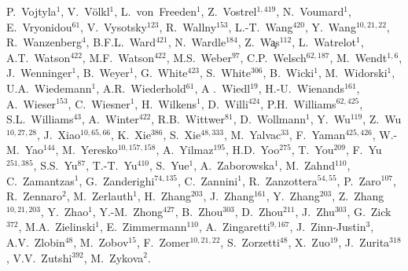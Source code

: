 P.~Vojtyla$^{{1}}$,
V.~V{\"o}lkl$^{{1}}$,
L.~von~Freeden$^{{1}}$,
Z.~Vostrel$^{{1, 419}}$,
N.~Voumard$^{{1}}$,
E.~Vryonidou$^{{61}}$,
V.~Vysotsky$^{{123}}$,
R.~Wallny$^{{153}}$,
L.-T.~Wang$^{{420}}$,
Y.~Wang$^{{10, 21, 22}}$,
R.~Wanzenberg$^{{4}}$,
B.F.L.~Ward$^{{421}}$,
N.~Wardle$^{{184}}$,
Z.~W{\c a}s$^{{112}}$,
L.~Watrelot$^{{1}}$,
A.T.~Watson$^{{422}}$,
M.F.~Watson$^{{422}}$,
M.S.~Weber$^{{97}}$,
C.P.~Welsch$^{{62, 187}}$,
M.~Wendt$^{{1, 6}}$,
J.~Wenninger$^{{1}}$,
B.~Weyer$^{{1}}$,
G.~White$^{{423}}$,
S.~White$^{{306}}$,
B.~Wicki$^{{1}}$,
M.~Widorski$^{{1}}$,
U.A.~Wiedemann$^{{1}}$,
A.R.~Wiederhold$^{{61}}$,
A .~Wiedl$^{{19}}$,
H.-U.~Wienands$^{{161}}$,
A.~Wieser$^{{153}}$,
C.~Wiesner$^{{1}}$,
H.~Wilkens$^{{1}}$,
D.~Willi$^{{424}}$,
P.H.~Williams$^{{62, 425}}$,
S.L.~Williams$^{{43}}$,
A.~Winter$^{{422}}$,
R.B.~Wittwer$^{{81}}$,
D.~Wollmann$^{{1}}$,
Y.~Wu$^{{119}}$,
Z.~Wu$^{{10, 27, 28}}$,
J.~Xiao$^{{10, 65, 66}}$,
K.~Xie$^{{386}}$,
S.~Xie$^{{48, 333}}$,
M.~Yalvac$^{{33}}$,
F.~Yaman$^{{425, 426}}$,
W.-M.~Yao$^{{144}}$,
M.~Yeresko$^{{10, 157, 158}}$,
A.~Yilmaz$^{{195}}$,
H.D.~Yoo$^{{275}}$,
T.~You$^{{209}}$,
F.~Yu$^{{251, 385}}$,
S.S.~Yu$^{{87}}$,
T.-T.~Yu$^{{410}}$,
S.~Yue$^{{1}}$,
A.~Zaborowska$^{{1}}$,
M.~Zahnd$^{{110}}$,
C.~Zamantzas$^{{1}}$,
G.~Zanderighi$^{{74, 135}}$,
C.~Zannini$^{{1}}$,
R.~Zanzottera$^{{54, 55}}$,
P.~Zaro$^{{107}}$,
R.~Zennaro$^{{2}}$,
M.~Zerlauth$^{{1}}$,
H.~Zhang$^{{203}}$,
J.~Zhang$^{{161}}$,
Y.~Zhang$^{{203}}$,
Z.~Zhang$^{{10, 21, 203}}$,
Y.~Zhao$^{{1}}$,
Y.-M.~Zhong$^{{427}}$,
B.~Zhou$^{{303}}$,
D.~Zhou$^{{211}}$,
J.~Zhu$^{{303}}$,
G.~Zick$^{{372}}$,
M.A.~Zielinski$^{{1}}$,
E.~Zimmermann$^{{110}}$,
A.~Zingaretti$^{{9, 167}}$,
J.~Zinn-Justin$^{{3}}$,
A.V.~Zlobin$^{{48}}$,
M.~Zobov$^{{15}}$,
F.~Zomer$^{{10, 21, 22}}$,
S.~Zorzetti$^{{48}}$,
X.~Zuo$^{{19}}$,
J.~Zurita$^{{318}}$,
V.V.~Zutshi$^{{392}}$,
M.~Zykova$^{{2}}$.